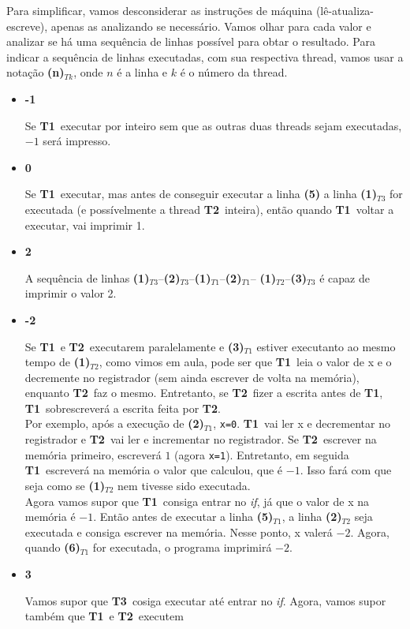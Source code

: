 \documentclass{article}
\newcommand{\Tu}{\textbf{T1}}
\newcommand{\Td}{\textbf{T2}}
\newcommand{\Tt}{\textbf{T3}}
\newcommand{\TL}[2]{\textbf{(#1)}$_{T#2}$}
\begin{document}
Para simplificar, vamos desconsiderar as instruções de máquina (lê-atualiza-escreve), apenas as analizando
se necessário. Vamos olhar para cada valor e analizar se há uma sequência de linhas possível para obtar o
resultado. Para indicar a sequência de linhas executadas, com sua respectiva thread, vamos usar a notação
\textbf{(n)}$_{Tk}$, onde $n$ é a linha e $k$ é o número da thread.

\begin{itemize}
	\item \textbf{-1}\par
		Se \Tu\ executar por inteiro sem que as outras duas threads sejam executadas, $-1$ será impresso.
	\item \textbf{0}\par
		Se \Tu\ executar, mas antes de conseguir executar a linha \textbf{(5)} a linha \TL{1}{3}
		for executada (e possívelmente a thread \Td\ inteira), então quando \Tu\ voltar a executar, vai imprimir 1.
	\item \textbf{2}\par
		A sequência de linhas \TL{1}{3}--\TL{2}{3}--\TL{1}{1}--\TL{2}{1}--%
		\TL{1}{2}--\TL{3}{3} é capaz de imprimir o valor 2.
	\item \textbf{-2}\par
		Se \Tu\ e \Td\ executarem paralelamente e \TL{3}{1} estiver executanto ao mesmo tempo de \TL{1}{2},
		como vimos em aula, pode ser que \Tu\ leia o valor de x e o decremente no registrador (sem ainda escrever
		de volta na memória), enquanto \Td\ faz o mesmo. Entretanto, se \Td\ fizer a escrita antes de \Tu, \Tu\
		sobrescreverá a escrita feita por \Td.\\
		Por exemplo, após a execução de \TL{2}{1}, \texttt{x=0}. \Tu\ vai ler x e decrementar no registrador e
		\Td\ vai ler e incrementar no registrador. Se \Td\ escrever na memória primeiro, escreverá $1$ (agora \texttt{x=1}).
		Entretanto, em seguida \Tu\ escreverá na memória o valor que calculou, que é $-1$. Isso fará com que seja como se
		\TL{1}{2} nem tivesse sido executada.\\
		Agora vamos supor que \Tu\ consiga entrar no \emph{if}, já que o valor de x na memória é $-1$. Então antes de executar
		a linha \TL{5}{1}, a linha \TL{2}{2} seja executada e consiga escrever na memória. Nesse ponto, x valerá $-2$. Agora,
		quando \TL{6}{1} for executada, o programa imprimirá $-2$.
	\item \textbf{3}\par
		Vamos supor que \Tt\ cosiga executar até entrar no \emph{if}. Agora, vamos supor também que \Tu\ e \Td\ executem

\end{itemize}
\end{document}
